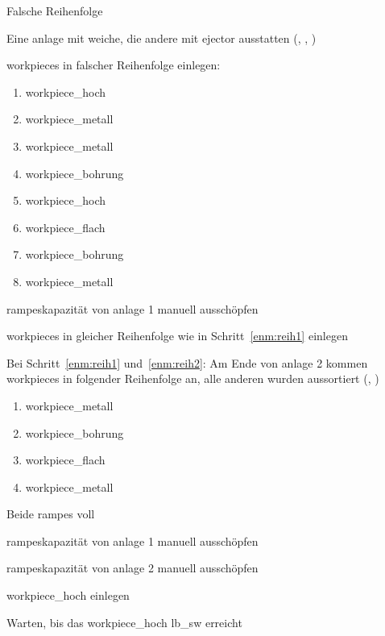    \begin{ablauf}{Falsche Reihenfolge}
        \item Eine \gls{anlage} mit \gls{weiche}, die andere mit \gls{ejector} ausstatten
        (, , )
        \item \Glspl{workpiece} in falscher Reihenfolge einlegen:\label{enm:reih1}
        \begin{enumerate}
            \item \gls{workpiece_hoch} %
            \item \gls{workpiece_metall}
            \item \gls{workpiece_metall} %
            \item \gls{workpiece_bohrung}
            \item \gls{workpiece_hoch} %
            \item \gls{workpiece_flach}
            \item \gls{workpiece_bohrung} %
            \item \gls{workpiece_metall}
        \end{enumerate}
        \item \Glspl{rampe}kapazität von \gls{anlage} 1 manuell ausschöpfen
        \item \Glspl{workpiece} in gleicher Reihenfolge wie in
        Schritt~\ref{enm:reih1} einlegen\label{enm:reih2}
    \end{ablauf}

    \begin{erwartung}
        \item Bei Schritt~\ref{enm:reih1} und~\ref{enm:reih2}: Am Ende von \gls{anlage} 2 kommen
        \Glspl{workpiece} in folgender Reihenfolge an,
        alle anderen wurden aussortiert (, )
        \begin{enumerate}
            \item \gls{workpiece_metall}
            \item \gls{workpiece_bohrung}
            \item \gls{workpiece_flach}
            \item \gls{workpiece_metall}
        \end{enumerate}
    \end{erwartung}

    \begin{ablauf}{Beide \glspl{rampe} voll}
        \item \Glspl{rampe}kapazität von \gls{anlage} 1 manuell ausschöpfen\label{enm:rampe1-voll}
        \item \Glspl{rampe}kapazität von \gls{anlage} 2 manuell ausschöpfen\label{enm:rampe2-voll}
        \item \gls{workpiece_hoch} einlegen
        \item Warten, bis das \gls{workpiece_hoch} \gls{lb_sw} erreicht\label{itm:workpiece-erreicht-switch}
    \end{ablauf}

